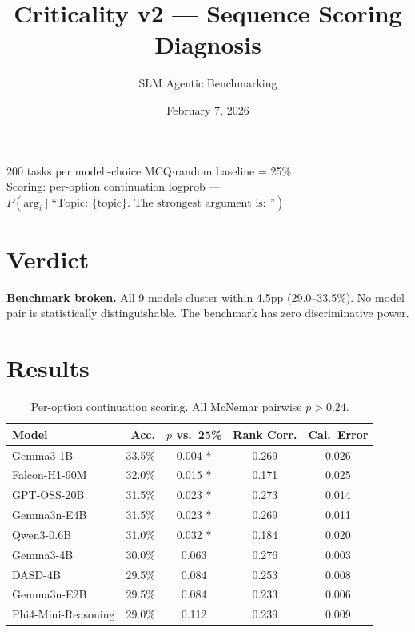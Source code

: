 \documentclass[11pt,a4paper]{article}
\title{\textbf{Criticality v2 --- Sequence Scoring Diagnosis}}
\author{SLM Agentic Benchmarking}
\date{February 7, 2026}
\begin{document}
\maketitle
\thispagestyle{empty}

\vspace{-1em}
\begin{center}
\small 200 tasks per model\enspace$\cdot$-choice MCQ\enspace$\cdot$\enspace random baseline = 25\%\\[2pt]
\small Scoring: per-option continuation logprob --- $P(\text{arg}_i \mid \text{``Topic: \{topic\}. The strongest argument is: ''})$
\end{center}

\section*{Verdict}

\colorbox{crit!10}{\parbox{\dimexpr\textwidth-2\fboxsep}{%
\textcolor{crit}{\textbf{Benchmark broken.}}
All 9 models cluster within 4.5pp (29.0--33.5\%). No model pair is statistically distinguishable.
The benchmark has zero discriminative power.}}

\section{Results}

\begin{table}[h]
\centering
\caption{Per-option continuation scoring. All McNemar pairwise $p > 0.24$.}
\vspace{4pt}
\begin{tabular}{@{}lrccc@{}}
\toprule
\textbf{Model} & \textbf{Acc.} & \textbf{$p$ vs.\ 25\%} & \textbf{Rank Corr.} & \textbf{Cal.\ Error} \\
\midrule
Gemma3-1B           & 33.5\% & 0.004 * & 0.269 & 0.026 \\
Falcon-H1-90M       & 32.0\% & 0.015 * & 0.171 & 0.025 \\
GPT-OSS-20B         & 31.5\% & 0.023 * & 0.273 & 0.014 \\
Gemma3n-E4B         & 31.5\% & 0.023 * & 0.269 & 0.011 \\
Qwen3-0.6B          & 31.0\% & 0.032 * & 0.184 & 0.020 \\
Gemma3-4B           & 30.0\% & 0.063   & 0.276 & 0.003 \\
DASD-4B             & 29.5\% & 0.084   & 0.253 & 0.008 \\
Gemma3n-E2B         & 29.5\% & 0.084   & 0.233 & 0.006 \\
Phi4-Mini-Reasoning & 29.0\% & 0.112   & 0.239 & 0.009 \\
\bottomrule
\end{tabular}
\label{tab:old-results}
\end{table}
\end{document}
